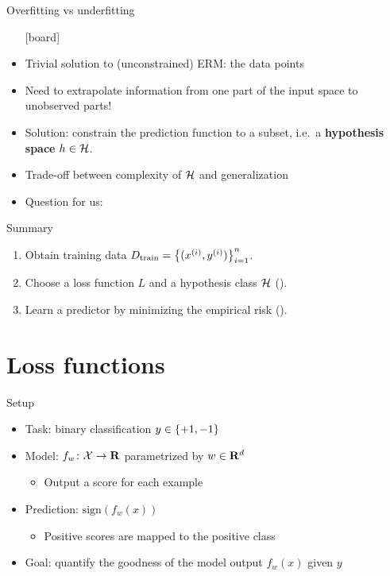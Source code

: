 \documentclass[usenames,dvipsnames,notes,11pt,aspectratio=169]{beamer}
\begin{document}

\begin{frame}
    {Overfitting vs underfitting}
    \begin{itemize}
        \item[] [board]
        \item Trivial solution to (unconstrained) ERM:  the data points
        \item Need to extrapolate information from one part of the input space to unobserved parts!
        \item Solution: constrain the prediction function to a subset, i.e.\ a \textbf{hypothesis space} $h\in \mathcal{H}$.
            \pause
        \item Trade-off between complexity of $\mathcal{H}$ and generalization 
        \item Question for us: 
    \end{itemize}
\end{frame}

\begin{frame}
    {Summary}
    \begin{enumerate}
        \itemsep2em
        \item Obtain training data $D_{\text{train}}=\left\{ (x^{(i)}, y^{(i)}) \right\}_{i=1}^n$.
        \item Choose a loss function $L$ and a hypothesis class $\mathcal{H}$ ().
        \item Learn a predictor by minimizing the empirical risk ().
    \end{enumerate}
\end{frame}

\section{Loss functions}

\begin{frame}
    {Setup}
    \begin{itemize}
        \itemsep1em
        \item Task: binary classification $y\in\left\{ +1, -1 \right\}$
        \item Model: $f_w\colon \mathcal{X} \rightarrow \mathbf{R}$ parametrized by $w \in \mathbf{R}^d$
            \begin{itemize}
                \item Output a score for each example
            \end{itemize}
        \item Prediction: $\text{sign}(f_w(x))$
            \begin{itemize}
                \item Positive scores are mapped to the positive class 
            \end{itemize}
        \item Goal: quantify the goodness of the model output $f_w(x)$ given $y$
    \end{itemize}
\end{frame}
\end{document}
